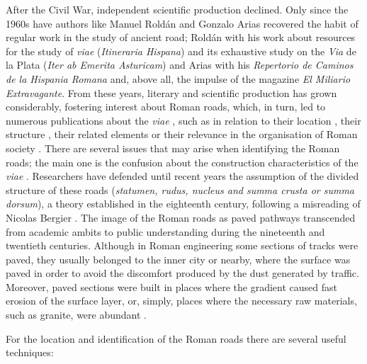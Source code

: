 	After the Civil War, independent scientific production declined. Only since the 1960s have authors like Manuel Roldán and Gonzalo Arias recovered the habit of regular work in the study of ancient road; Roldán with his work about resources for the study of \textit{viae} (\textit{Itineraria Hispana}) and its exhaustive study on the \textit{Via} de la Plata (\textit{Iter ab Emerita Asturicam}) and Arias with his \textit{Repertorio de Caminos de la Hispania Romana} and, above all, the impulse of the magazine \textit{El Miliario Extravagante}. From these years, literary and scientific production has grown considerably, fostering interest about Roman roads, which, in turn, led to numerous publications about the \textit{viae} \parencites{Blázquez_2006}{Chevallier_1997}{Moreno_2004}, such as in relation to their location \parencites{Morote_2002}{Roldán_1971}{Sillières_1990}, their structure \parencite{Moreno_2009}, their related elements \parencites{Arasa_1990}{Rodriguez_2004} or their relevance in the organisation of Roman society \parencites{Pisani_1994}{Ponte_2007}.
\myseparator
{}%
	There are several issues that may arise when identifying the Roman roads; the main one is the confusion about the construction characteristics of the \textit{viae} \parencite[11--12]{Moreno_2010}. Researchers \parencites{Chevallier_1997}{Moreno_2004}{Moreno_2009}{Sillières_1990} have defended until recent years the assumption of the divided structure of these roads (\textit{statumen, rudus, nucleus and summa crusta or summa dorsum}), a theory established in the eighteenth century, following a misreading of Nicolas Bergier \parencite[93--93]{Chevallier_1997}. The image of the Roman roads as paved pathways transcended from academic ambits to public understanding during the nineteenth and twentieth centuries. Although in Roman engineering some sections of tracks were paved, they usually belonged to the inner city or nearby, where the surface was paved in order to avoid the discomfort produced by the dust generated by traffic. Moreover, paved sections were built in places where the gradient caused fast erosion of the surface layer, or, simply, places where the necessary raw materials, such as granite, were abundant \parencite[51]{Rodriguez_2004}.
	
	For the location and identification of the Roman roads there are several useful techniques:
	
